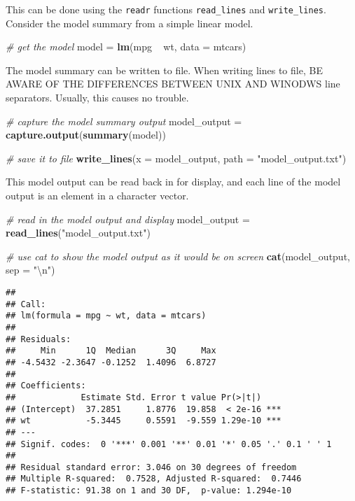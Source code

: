 \documentclass[
]{book}
\newenvironment{Shaded}{}{}
\newcommand{\CharTok}[1]{\textcolor[rgb]{0.25,0.44,0.63}{#1}}
\newcommand{\CommentTok}[1]{\textcolor[rgb]{0.38,0.63,0.69}{\textit{#1}}}
\newcommand{\DataTypeTok}[1]{\textcolor[rgb]{0.56,0.13,0.00}{#1}}
\newcommand{\KeywordTok}[1]{\textcolor[rgb]{0.00,0.44,0.13}{\textbf{#1}}}
\newcommand{\NormalTok}[1]{#1}
\newcommand{\OperatorTok}[1]{\textcolor[rgb]{0.40,0.40,0.40}{#1}}
\newcommand{\StringTok}[1]{\textcolor[rgb]{0.25,0.44,0.63}{#1}}
\begin{document}
This can be done using the \texttt{readr} functions \texttt{read\_lines} and \texttt{write\_lines}. Consider the model summary from a simple linear model.

\begin{Shaded}
\begin{Highlighting}[]
\CommentTok{# get the model}
\NormalTok{model =}\StringTok{ }\KeywordTok{lm}\NormalTok{(mpg }\OperatorTok{~}\StringTok{ }\NormalTok{wt, }\DataTypeTok{data =}\NormalTok{ mtcars)}
\end{Highlighting}
\end{Shaded}

The model summary can be written to file. When writing lines to file, BE AWARE OF THE DIFFERENCES BETWEEN UNIX AND WINODWS line separators. Usually, this causes no trouble.

\begin{Shaded}
\begin{Highlighting}[]
\CommentTok{# capture the model summary output}
\NormalTok{model_output =}\StringTok{ }\KeywordTok{capture.output}\NormalTok{(}\KeywordTok{summary}\NormalTok{(model))}

\CommentTok{# save it to file}
\KeywordTok{write_lines}\NormalTok{(}\DataTypeTok{x =}\NormalTok{ model_output,}
  \DataTypeTok{path =} \StringTok{"model_output.txt"}\NormalTok{)}
\end{Highlighting}
\end{Shaded}

This model output can be read back in for display, and each line of the model output is an element in a character vector.

\begin{Shaded}
\begin{Highlighting}[]
\CommentTok{# read in the model output and display}
\NormalTok{model_output =}\StringTok{ }\KeywordTok{read_lines}\NormalTok{(}\StringTok{"model_output.txt"}\NormalTok{)}

\CommentTok{# use cat to show the model output as it would be on screen}
\KeywordTok{cat}\NormalTok{(model_output, }\DataTypeTok{sep =} \StringTok{"}\CharTok{\textbackslash{}n}\StringTok{"}\NormalTok{)}
\end{Highlighting}
\end{Shaded}

\begin{verbatim}
## 
## Call:
## lm(formula = mpg ~ wt, data = mtcars)
## 
## Residuals:
##     Min      1Q  Median      3Q     Max 
## -4.5432 -2.3647 -0.1252  1.4096  6.8727 
## 
## Coefficients:
##             Estimate Std. Error t value Pr(>|t|)    
## (Intercept)  37.2851     1.8776  19.858  < 2e-16 ***
## wt           -5.3445     0.5591  -9.559 1.29e-10 ***
## ---
## Signif. codes:  0 '***' 0.001 '**' 0.01 '*' 0.05 '.' 0.1 ' ' 1
## 
## Residual standard error: 3.046 on 30 degrees of freedom
## Multiple R-squared:  0.7528, Adjusted R-squared:  0.7446 
## F-statistic: 91.38 on 1 and 30 DF,  p-value: 1.294e-10
\end{verbatim}
\end{document}
